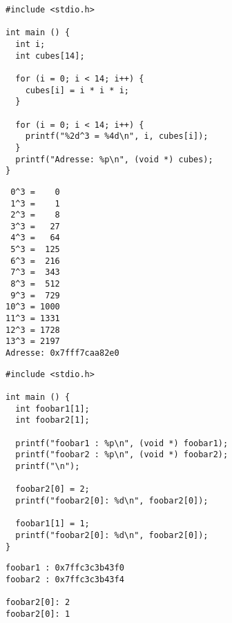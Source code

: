 
\begin{frame}[fragile]
%
%
\begin{codebox}[Beispiel]
\begin{verbatim}
#include <stdio.h>

int main () {
  int i;
  int cubes[14];
  
  for (i = 0; i < 14; i++) {
    cubes[i] = i * i * i;
  }
  
  for (i = 0; i < 14; i++) {
    printf("%2d^3 = %4d\n", i, cubes[i]);
  }
  printf("Adresse: %p\n", (void *) cubes);
}
\end{verbatim}
\end{codebox}%
%
%
\begin{cmdbox}[Ausgabe]
\begin{verbatim}
 0^3 =    0
 1^3 =    1
 2^3 =    8
 3^3 =   27
 4^3 =   64
 5^3 =  125
 6^3 =  216
 7^3 =  343
 8^3 =  512
 9^3 =  729
10^3 = 1000
11^3 = 1331
12^3 = 1728
13^3 = 2197
Adresse: 0x7fff7caa82e0
\end{verbatim}
\end{cmdbox}
%
\end{frame}


\begin{frame}[fragile]
%
%
\begin{warnbox}[Speicherverletzung, leftupper=6mm]
\begin{verbatim}
#include <stdio.h>

int main () {
  int foobar1[1];
  int foobar2[1];
  
  printf("foobar1 : %p\n", (void *) foobar1);
  printf("foobar2 : %p\n", (void *) foobar2);
  printf("\n");
  
  foobar2[0] = 2;
  printf("foobar2[0]: %d\n", foobar2[0]);

  foobar1[1] = 1;  
  printf("foobar2[0]: %d\n", foobar2[0]);
}
\end{verbatim}
\end{warnbox}%
%
%
\begin{cmdbox}[Ausgabe]
\begin{verbatim}
foobar1 : 0x7ffc3c3b43f0
foobar2 : 0x7ffc3c3b43f4

foobar2[0]: 2
foobar2[0]: 1
\end{verbatim}
\end{cmdbox}
%
\end{frame}

